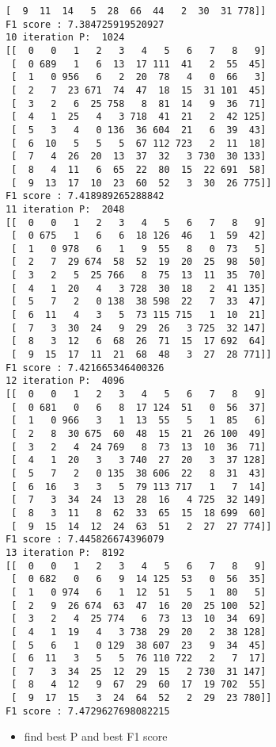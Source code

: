 \documentclass[11pt]{article}
\providecommand{\tightlist}{%
      \setlength{\itemsep}{0pt}\setlength{\parskip}{0pt}}
\begin{document}
\begin{Verbatim}[commandchars=\\\{\}]
 [  9  11  14   5  28  66  44   2  30  31 778]]
F1 score : 7.384725919520927
10 iteration P:  1024
[[  0   0   1   2   3   4   5   6   7   8   9]
 [  0 689   1   6  13  17 111  41   2  55  45]
 [  1   0 956   6   2  20  78   4   0  66   3]
 [  2   7  23 671  74  47  18  15  31 101  45]
 [  3   2   6  25 758   8  81  14   9  36  71]
 [  4   1  25   4   3 718  41  21   2  42 125]
 [  5   3   4   0 136  36 604  21   6  39  43]
 [  6  10   5   5   5  67 112 723   2  11  18]
 [  7   4  26  20  13  37  32   3 730  30 133]
 [  8   4  11   6  65  22  80  15  22 691  58]
 [  9  13  17  10  23  60  52   3  30  26 775]]
F1 score : 7.418989265288842
11 iteration P:  2048
[[  0   0   1   2   3   4   5   6   7   8   9]
 [  0 675   1   6   6  18 126  46   1  59  42]
 [  1   0 978   6   1   9  55   8   0  73   5]
 [  2   7  29 674  58  52  19  20  25  98  50]
 [  3   2   5  25 766   8  75  13  11  35  70]
 [  4   1  20   4   3 728  30  18   2  41 135]
 [  5   7   2   0 138  38 598  22   7  33  47]
 [  6  11   4   3   5  73 115 715   1  10  21]
 [  7   3  30  24   9  29  26   3 725  32 147]
 [  8   3  12   6  68  26  71  15  17 692  64]
 [  9  15  17  11  21  68  48   3  27  28 771]]
F1 score : 7.421665346400326
12 iteration P:  4096
[[  0   0   1   2   3   4   5   6   7   8   9]
 [  0 681   0   6   8  17 124  51   0  56  37]
 [  1   0 966   3   1  13  55   5   1  85   6]
 [  2   8  30 675  60  48  15  21  26 100  49]
 [  3   2   4  24 769   8  73  13  10  36  71]
 [  4   1  20   3   3 740  27  20   3  37 128]
 [  5   7   2   0 135  38 606  22   8  31  43]
 [  6  16   3   3   5  79 113 717   1   7  14]
 [  7   3  34  24  13  28  16   4 725  32 149]
 [  8   3  11   8  62  33  65  15  18 699  60]
 [  9  15  14  12  24  63  51   2  27  27 774]]
F1 score : 7.445826674396079
13 iteration P:  8192
[[  0   0   1   2   3   4   5   6   7   8   9]
 [  0 682   0   6   9  14 125  53   0  56  35]
 [  1   0 974   6   1  12  51   5   1  80   5]
 [  2   9  26 674  63  47  16  20  25 100  52]
 [  3   2   4  25 774   6  73  13  10  34  69]
 [  4   1  19   4   3 738  29  20   2  38 128]
 [  5   6   1   0 129  38 607  23   9  34  45]
 [  6  11   3   5   5  76 110 722   2   7  17]
 [  7   3  34  25  12  29  15   2 730  31 147]
 [  8   4  12   9  67  29  60  17  19 702  55]
 [  9  17  15   3  24  64  52   2  29  23 780]]
F1 score : 7.4729627698082215

    \end{Verbatim}

    \begin{itemize}
\tightlist
\item
  find best P and best F1 score
\end{itemize}
\end{document}
